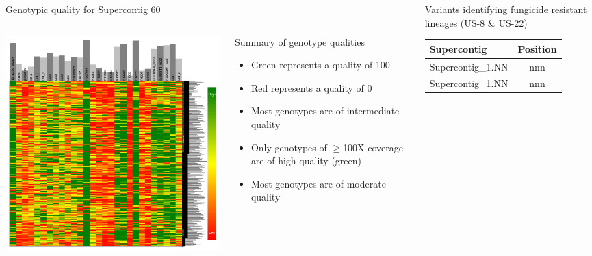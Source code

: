 \documentclass[final,t]{beamer}
\begin{document}
\begin{frame}{}
\begin{columns}[t]
\begin{column}{.4\linewidth}
      \begin{block}{Genotypic quality for Supercontig 60}
        \begin{columns}[t]
          \begin{column}[T]{0.6\linewidth}
            \includegraphics[width=0.9\linewidth, height=0.6\linewidth]{heatmap3.png}
          \end{column}
          \begin{column}[T]{0.4\linewidth}
            Summary of genotype qualities
            \begin{itemize}
              \item Green represents a quality of 100
              \item Red represents a quality of 0
              \item Most genotypes are of intermediate quality
              \item Only genotypes of $\geq$100X coverage are of high quality (green)
              \item Most genotypes are of moderate quality
            \end{itemize}
          \end{column}
        \end{columns}
      \end{block}




    \end{column}

    
    \begin{column}{.28\linewidth}

  \begin{block}{Variants identifying fungicide resistant lineages (US-8 \& US-22)}
    \begin{table}
    \begin{tabular}{lc}
      \hline
        \textbf{Supercontig} & \textbf{Position} \\
      \hline
        Supercontig\_1.NN & nnn \\
        Supercontig\_1.NN & nnn \\
      \hline
    \end{tabular}
    \end{table}


\end{block}
\end{column}
\end{columns}
\end{frame}
\end{document}
